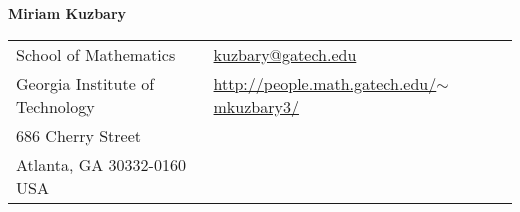 \documentclass[letterpaper,11pt,oneside]{article}
\begin{document}

\noindent  \LARGE{\textbf{Miriam Kuzbary}}  \\
\vspace{-2ex}
\normalsize


\begin{center}
\begin{tabular}{l l}
School of Mathematics	    & \hspace{1in} \href{mailto:kuzbary@gatech.edu}{kuzbary@gatech.edu} \\
Georgia Institute of Technology    & \hspace{1in}  \href{http://people.math.gatech.edu/~mkuzbary3/}{http://people.math.gatech.edu/$\sim$mkuzbary3/}   \\
686 Cherry Street         &  \\
Atlanta, GA 30332-0160 USA & \hspace{1in}  \\
\end{tabular}
\end{center}

\vspace{1em}

\end{document}
